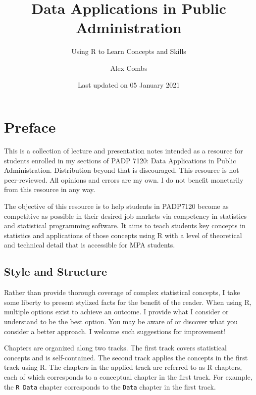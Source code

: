 \documentclass[
]{book}
\title{Data Applications in Public Administration}
\subtitle{Using R to Learn Concepts and Skills}
\author{Alex Combs}
\date{Last updated on 05 January 2021}
\begin{document}
\maketitle

\cleardoublepage\newpage
\thispagestyle{empty}

\setlength{\abovedisplayskip}{-5pt}
\setlength{\abovedisplayshortskip}{-5pt}

{
\hypersetup{linkcolor=}
\setcounter{tocdepth}{2}
\tableofcontents
}
\hypertarget{preface}{%
\chapter*{Preface}\label{preface}}

This is a collection of lecture and presentation notes intended as a resource for students enrolled in my sections of PADP 7120: Data Applications in Public Administration. Distribution beyond that is discouraged. This resource is not peer-reviewed. All opinions and errors are my own. I do not benefit monetarily from this resource in any way.

The objective of this resource is to help students in PADP7120 become as competitive as possible in their desired job markets via competency in statistics and statistical programming software. It aims to teach students key concepts in statistics and applications of those concepts using R with a level of theoretical and technical detail that is accessible for MPA students.

\hypertarget{style-and-structure}{%
\section*{Style and Structure}\label{style-and-structure}}

Rather than provide thorough coverage of complex statistical concepts, I take some liberty to present stylized facts for the benefit of the reader. When using R, multiple options exist to achieve an outcome. I provide what I consider or understand to be the best option. You may be aware of or discover what you consider a better approach. I welcome such suggestions for improvement!

Chapters are organized along two tracks. The first track covers statistical concepts and is self-contained. The second track applies the concepts in the first track using R. The chapters in the applied track are referred to as R chapters, each of which corresponds to a conceptual chapter in the first track. For example, the \texttt{R\ Data} chapter corresponds to the \texttt{Data} chapter in the first track.
\end{document}
